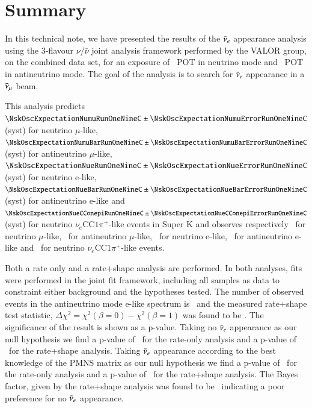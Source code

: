 \section {Summary}
\label{sec:summary}

In this technical note, we have presented the results of the $\bar{\nu}_{e}$ appearance analysis using the 3-flavour $\nu$/$\bar{\nu}$ joint analysis framework performed by the VALOR group, on the combined \RunPeriod data set, for an exposure of \TotalPotNuRunOneNineC\ POT in neutrino mode and \TotalPotNuBarRunOneNineC\ POT in antineutrino mode. The goal of the analysis is to search for $\bar{\nu}_{e}$ appearance in a $\bar{\nu}_{\mu}$ beam.

This analysis predicts $\NskOscExpectationNumuRunOneNineC \pm \NskOscExpectationNumuErrorRunOneNineC$ (syst) for neutrino $\mu$-like, $\NskOscExpectationNumuBarRunOneNineC \pm \NskOscExpectationNumuBarErrorRunOneNineC$ (syst) for antineutrino $\mu$-like, $\NskOscExpectationNueRunOneNineC \pm \NskOscExpectationNueErrorRunOneNineC$ (syst) for neutrino e-like, $\NskOscExpectationNueBarRunOneNineC \pm \NskOscExpectationNueBarErrorRunOneNineC$ (syst) for antineutrino e-like and $\NskOscExpectationNueCConepiRunOneNineC \pm \NskOscExpectationNueCConepiErrorRunOneNineC$ (syst) for neutrino $\nu_{e}\textrm{CC}1\pi^{+}$-like events in Super K and observes respectively \NskObservedNumuRunOneNineC\ for neutrino $\mu$-like, \NskObservedNumuBarRunOneNineC\ for antineutrino $\mu$-like, \NskObservedNueRunOneNineC\ for neutrino e-like, \NskObservedNueBarRunOneNineC\ for antineutrino e-like and \NskObservedNueCConepiRunOneNineC\ for neutrino $\nu_{e}\textrm{CC}1\pi^{+}$-like events.

Both a rate only and a rate+shape analysis are performed. In both analyses, fits were performed in the joint fit framework, including all samples as data to constraint either background and the hypotheses tested. The number of observed events in the antineutrino mode e-like spectrum is \NskObservedNueBarRunOneNineC\ and the measured rate+shape test statistic, $\Delta \chi^2 = \chi^2\left( \beta = 0 \right) - \chi^2\left( \beta = 1 \right)$ was found to be \DeltachisqData. The significance of the result is shown as a p-value. Taking no $\bar{\nu}_{e}$ appearance as our null hypothesis we find a p-value of \pvalRateOnlyBetaZeroData\ for the rate-only analysis and a p-value of \pvalRateShapeBetaZeroData\ for the rate+shape analysis. Taking $\bar{\nu}_{e}$ appearance according to the best knowledge of the PMNS matrix as our null hypothesis we find a p-value of \pvalRateOnlyBetaOneData\ for the rate-only analysis and a p-value of \pvalRateShapeBetaOneData\ for the rate+shape analysis. The Bayes factor, given by the rate+shape analysis was found to be \BayesFactorData\, indicating a poor preference for no $\bar{\nu}_{e}$ appearance.